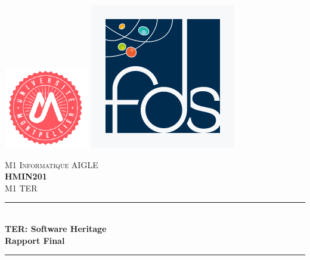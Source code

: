 \documentclass[12pt,a4paper]{report}
\newcommand{\HRule}{\rule{\linewidth}{0.5mm}} %
\theoremstyle{definition}
\begin{document}
\begin{titlepage}
\center

\includegraphics[scale=0.5]{images/umLogo.png} %
\hspace{\fill}
\includegraphics[scale=0.25]{images/fdsLogo.jpg} %

\textsc{\LARGE M1 Informatique AIGLE}\\[1cm]
\textsc{\Large \textbf{HMIN201}}\\[0.25cm]
\textsc{\large M1 TER}\\[0.5cm]

\HRule \\[0.4cm]
{ \huge \bfseries TER: Software Heritage}\\[0.4cm]
{ \Large \bfseries Rapport Final}\\[0.4cm]
\HRule \\[0.5cm]


\end{titlepage}
\end{document}
